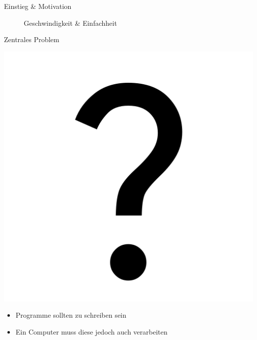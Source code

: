 \begin{frame}{Einstieg \& Motivation}
\begin{figure}[h]
\begin{minipage}{.32\textwidth}
\begin{center}
				{\small Geschwindigkeit \& Einfachheit }
			\end{center}
		\end{minipage}
		\begin{center}
		\end{center}
	\end{figure}
\end{frame}

\begin{frame}{Zentrales Problem}
	\begin{minipage}{.35\textwidth}
	\end{minipage}%
	\hfill
	\hfill
	\begin{minipage}{.34\textwidth}
		\centerline{\includegraphics[width=.5\textwidth]{assets/google_icon_question_mark.png}}
	\end{minipage}

	\begin{itemize}
		\item Programme sollten  zu schreiben sein
		\item[\Rightarrow] Ein Computer muss diese jedoch auch  verarbeiten
	\end{itemize}
\end{frame}

